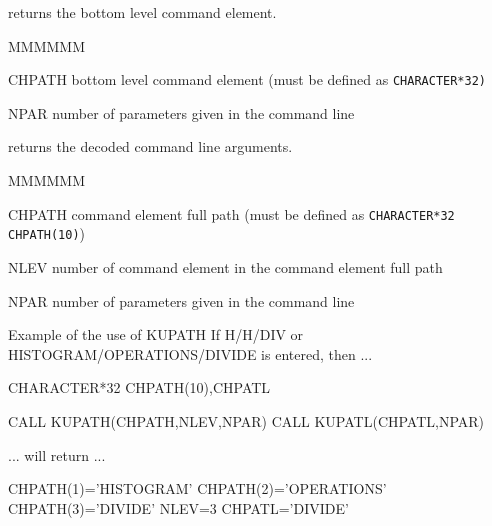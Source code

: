 \Action returns the bottom level command element.
\Pdesc\begin{DLtt}{MMMMMM}
\item[CHPATH] bottom level command element (must be defined as {\tt CHARACTER*32)}
\item[NPAR] number of parameters given in the command line
\end{DLtt}

\Action returns the decoded command line arguments. 
\Pdesc\begin{DLtt}{MMMMMM}
\item[CHPATH] command element full path 
(must be defined as {\tt CHARACTER*32 CHPATH(10)})
\item[NLEV] number of command element in the command element full path
\item[NPAR] number of parameters given in the command line
\end{DLtt}
\begin{XMPt}{Example of the use of KUPATH}
If H/H/DIV or HISTOGRAM/OPERATIONS/DIVIDE is entered, then ...
 
      CHARACTER*32 CHPATH(10),CHPATL
 
      CALL KUPATH(CHPATH,NLEV,NPAR)
      CALL KUPATL(CHPATL,NPAR)
 
 ...   will return   ...
 
CHPATH(1)='HISTOGRAM'
CHPATH(2)='OPERATIONS'
CHPATH(3)='DIVIDE'
NLEV=3
CHPATL='DIVIDE'
\end{XMPt}



